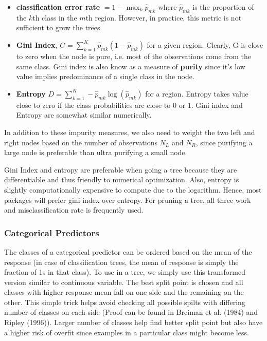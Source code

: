 \documentclass[../statistical_learning_notes.tex]{subfiles}
\begin{document}
    \begin{itemize}
        \item \textbf{classification error rate} $= 1 - \max_{k}\hat{p}_{mk}$ where $\hat{p}_{mk}$ is the proportion of the $k$th class in the $m$th region. However, in practice, this metric is not sufficient to grow the trees.
        \item \textbf{Gini Index}, $G = \sum_{k=1}^{K} \hat{p}_{mk} (1 - \hat{p}_{mk})$ for a given region. Clearly, G is close to zero when the node is pure, i.e. most of the observations come from the same class. Gini index is also know as a measure of \textbf{purity} since it's low value implies predominance of a single class in the node.
        \item \textbf{Entropy} $D = \sum_{k=1}^{K} -\hat{p}_{mk} \log(\hat{p}_{mk})$ for a region. Entropy takes value close to zero if the class probabilities are close to $0$ or $1$. Gini index and Entropy are somewhat similar numerically.
    \end{itemize}
    In addition to these impurity measures, we also need to weight the two left and right nodes based on the number of observations $N_{L}$ and $N_{R}$, since purifying a large node is preferable than ultra purifying a small node.\newline

    Gini Index and entropy are preferable when going a tree because they are differentiable and thus friendly to numerical optimization. Also, entropy is slightly computationally expensive to compute due to the logarithm. Hence, most packages will prefer gini index over entropy.\newline
    For pruning a tree, all three work and misclassification rate is frequently used.

    \subsubsection*{Categorical Predictors}
    The classes of a categorical predictor can be ordered based on the mean of the response (in case of classification trees, the mean of response is simply the fraction of 1s in that class). To use in a tree, we simply use this transformed version similar to continuous variable. The best split point is chosen and all classes with higher response mean fall on one side and the remaining on the other. This simple trick helps avoid checking all possible spilts with differing number of classes on each side (Proof can be found in Breiman et al. (1984) and Ripley (1996)). Larger number of classes help find better split point but also have a higher risk of overfit since examples in a particular class might become less.
\end{document}
